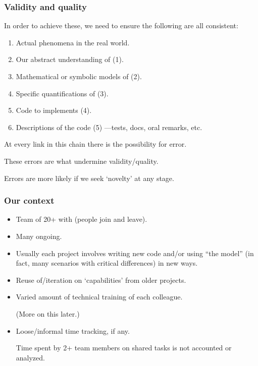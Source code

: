\documentclass[12pt,aspectratio=169]{beamer}
\begin{document}
\begin{frame}
\frametitle{Validity and quality}
In order to achieve these,
we need to ensure the following are all consistent:
\begin{enumerate}
  \item Actual phenomena in the real world.
  \item Our abstract understanding of (1).
  \item Mathematical or symbolic models of (2).
  \item Specific quantifications of (3).
  \item Code to implements (4).
  \item Descriptions of the code (5)
    —tests, docs, oral remarks, etc.
\end{enumerate}

\medskip
At every link in this chain there is the possibility for error.

These errors are what undermine validity/quality.

Errors are more likely if we seek ‘novelty’ at any stage.
\end{frame}

\begin{frame}
\frametitle{Our context}

\begin{itemize}
  \item Team of 20+ with 
    (people join and leave).
  \item Many  ongoing.
  \item Usually each project involves writing new code
    and/or using “the model” (in fact, many scenarios with critical differences) in new ways.
  \item Reuse of/iteration on ‘capabilities' from older projects.
  \item Varied amount of technical training of each colleague.

    (More on this later.)
  \item Loose/informal time tracking, if any.

    Time spent by 2+ team members on shared tasks is not accounted or analyzed.
\end{itemize}
\end{frame}
\end{document}
